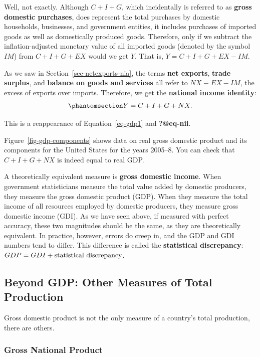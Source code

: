 \documentclass[
  letterpaper,
]{book}
\begin{document}
Well, not exactly. Although \(C+I+G\), which incidentally is referred to
as \textbf{gross domestic purchases},
does represent the total purchases by domestic households, businesses,
and government entities, it includes purchases of imported goods as well
as domestically produced goods. Therefore, only if we subtract the
inflation-adjusted monetary value of all imported goods (denoted by the
symbol \(IM\)) from \(C+I+G+EX\) would we get \(Y\). That is,
\(Y=C+I+G+EX-IM\).

As we saw in Section~\ref{sec-netexports-nia}, the terms \textbf{net
exports}, \textbf{trade surplus}, and \textbf{balance on goods and
services} all refer to \(NX\equiv EX-IM\), the excess of exports over
imports. Therefore, we get the \textbf{national income
identity}:
\begin{equation}\phantomsection\label{eq-ni-identity}{
Y=C+I+G+NX.
}\end{equation}

This is a reappearance of Equation~\ref{eq-gdp1} and \textbf{?@eq-nii}.

Figure~\ref{fig-gdp-components} shows data on real gross domestic
product and its components for the United States for the years 2005--8.
You can check that \(C+I+G+NX\) is indeed equal to real GDP.

A theoretically equivalent measure is \textbf{gross domestic income}.
When government statisticians measure the total value added by domestic
producers, they measure the gross domestic product (GDP). When they
measure the total income of all resources employed by domestic
producers, they measure gross domestic income (GDI). As we have seen
above, if measured with perfect accuracy, these two magnitudes should be
the same, as they are theoretically equivalent. In practice, however,
errors do creep in, and the GDP and GDI numbers tend to differ. This
difference is called the \textbf{statistical discrepancy}:
\(GDP=GDI+\hbox{statistical discrepancy}\).

\subsection{Beyond GDP: Other Measures of Total
Production}\label{sec-beyond-gdp}

Gross domestic product is not the only measure of a country's total
production, there are others.

\subsubsection{Gross National Product}\label{sec-gnp}
\end{document}
